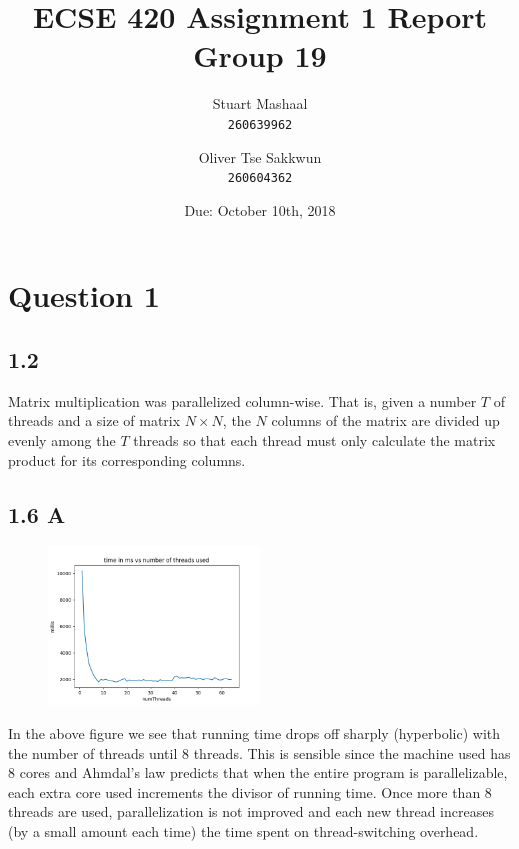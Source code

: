 \documentclass[11pt, letterpaper]{article}
\title{ECSE 420 Assignment 1 Report\\Group 19}
\author{
    Stuart Mashaal\\
    \texttt{260639962}
    \and
    Oliver Tse Sakkwun\\
    \texttt{260604362}
}
\date{Due: October 10th, 2018}
\begin{document}
\begin{titlepage}
    \maketitle
    \thispagestyle{empty}
    \setcounter{page}{0}
\end{titlepage}

\section*{Question 1}

\subsection*{1.2}
\label{sub:1_2}

Matrix multiplication was parallelized column-wise. That is, given a number $T$ of threads and a size of matrix $N \times N$, the $N$ columns of the matrix are divided up evenly among the $T$ threads so that each thread must only calculate the matrix product for its corresponding columns.

\subsection*{1.6 A}

\begin{figure}[h]
    \centering
    \includegraphics[width=0.5\textwidth]{thread_count_plot.png}
\end{figure}

In the above figure we see that running time drops off sharply (hyperbolic) with the number of
threads until 8 threads. This is sensible since the machine used has 8 cores and Ahmdal's law
predicts that when the entire program is parallelizable, each extra core used increments
the divisor of running time. Once more than 8 threads are used, parallelization is not improved and
each new thread increases (by a small amount each time) the time spent on thread-switching overhead.\\
\end{document}
